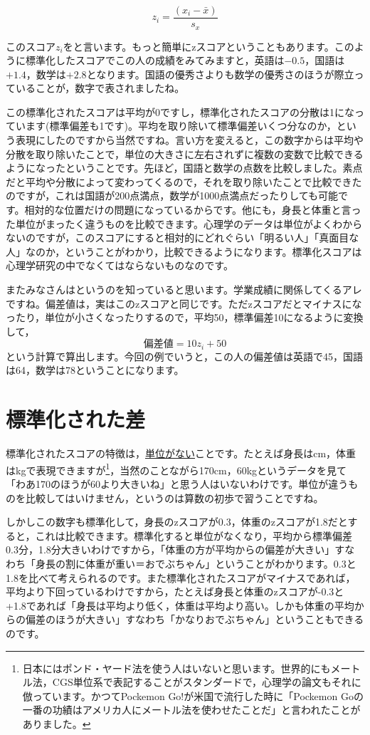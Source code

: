 \documentclass{ltjbook}
\begin{document}
\[ z_i = \frac{(x_i - \bar{x})}{s_x}\]

このスコア$z_i$をと言います。もっと簡単にzスコアということもあります。このように標準化したスコアでこの人の成績をみてみますと，英語は$-0.5$，国語は$+1.4$，数学は$+2.8$となります。国語の優秀さよりも数学の優秀さのほうが際立っていることが，数字で表されましたね。

この標準化されたスコアは平均が0ですし，標準化されたスコアの分散は1になっています(標準偏差も1です)。平均を取り除いて標準偏差いくつ分なのか，という表現にしたのですから当然ですね。言い方を変えると，この数字からは平均や分散を取り除いたことで，単位の大きさに左右されずに複数の変数で比較できるようになったということです。先ほど，国語と数学の点数を比較しました。素点だと平均や分散によって変わってくるので，それを取り除いたことで比較できたのですが，これは国語が200点満点，数学が1000点満点だったりしても可能です。相対的な位置だけの問題になっているからです。他にも，身長と体重と言った単位がまったく違うものを比較できます。心理学のデータは単位がよくわからないのですが，このスコアにすると相対的にどれぐらい「明るい人」「真面目な人」なのか，ということがわかり，比較できるようになります。標準化スコアは心理学研究の中でなくてはならないものなのです。

またみなさんはというのを知っていると思います。学業成績に関係してくるアレですね。偏差値は，実はこのzスコアと同じです。ただzスコアだとマイナスになったり，単位が小さくなったりするので，平均50，標準偏差10になるように変換して，
\[ \text{偏差値}= 10z_i + 50 \]
という計算で算出します。今回の例でいうと，この人の偏差値は英語で45，国語は64，数学は78ということになります。

\section{標準化された差}
\label{std_effectsize}
標準化されたスコアの特徴は，\underline{単位がない}ことです。たとえば身長はcm，体重はkgで表現できますが\footnote{日本にはポンド・ヤード法を使う人はいないと思います。世界的にもメートル法，CGS単位系で表記することがスタンダードで，心理学の論文もそれに倣っています。かつてPockemon Go!が米国で流行した時に「Pockemon Goの一番の功績はアメリカ人にメートル法を使わせたことだ」と言われたことがありました。}，当然のことながら170cm，60kgというデータを見て「わあ170のほうが60より大きいね」と思う人はいないわけです。単位が違うものを比較してはいけません，というのは算数の初歩で習うことですね。

しかしこの数字も標準化して，身長のzスコアが0.3，体重のzスコアが1.8だとすると，これは比較できます。標準化すると単位がなくなり，平均から標準偏差0.3分，1.8分大きいわけですから，「体重の方が平均からの偏差が大きい」すなわち「身長の割に体重が重い＝おでぶちゃん」ということがわかります。0.3と1.8を比べて考えられるのです。また標準化されたスコアがマイナスであれば，平均より下回っているわけですから，たとえば身長と体重のzスコアが-0.3と+1.8であれば「身長は平均より低く，体重は平均より高い。しかも体重の平均からの偏差のほうが大きい」すなわち「かなりおでぶちゃん」ということもできるのです。
\end{document}
